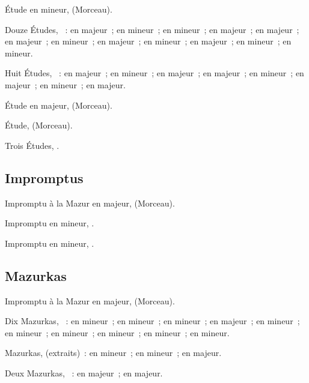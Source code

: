 Étude en \kC \Sharp mineur,   (Morceau).

Douze Études, ~:  en \kC \Sharp majeur~;  en \kF
\Sharp mineur~;  en \kB mineur~;  en \kB majeur~;
 en \kE majeur~;  en \kA majeur~;  en \kB
\Flat mineur~;  en \kA \Flat majeur~;  en \kG \Sharp
mineur~;  en \kD \Flat majeur~;  en \kB \Flat mineur~;
 en \kD \Sharp mineur.

Huit Études, ~:  en \kD \Flat majeur~;  en \kF
\Sharp mineur~;  en \kF \Sharp majeur~;  en \kF \Sharp
majeur~;  en \kC \Sharp mineur~;  en \kD \Flat majeur~;
 en \kF mineur~;  en \kE \Flat majeur.

Étude en \kE \Flat majeur,   (Morceau).

Étude,   (Morceau).

Trois Études, .

\subsection{Impromptus}

Impromptu à la Mazur en \kC majeur,   (Morceau).

Impromptu en \kB \Flat mineur,  .

Impromptu en \kF \Sharp mineur,  .

\subsection{Mazurkas}

Impromptu à la Mazur en \kC majeur,   (Morceau).

Dix Mazurkas, ~:  en \kB mineur~;  en \kF \Sharp
mineur~;  en \kG mineur~;  en \kE majeur~;  en
\kD \Sharp mineur~;  en \kC \Sharp mineur~;  en \kE
mineur~;  en \kB \Flat mineur~;  en \kG \Sharp mineur~;
 en \kE \Flat mineur.

Mazurkas,  (extraits)~:  en \kE mineur~;  en
\kF \Sharp mineur~;  en \kB majeur.

Deux Mazurkas, ~:  en \kD \Flat majeur~;  en
\kF \Sharp majeur.

